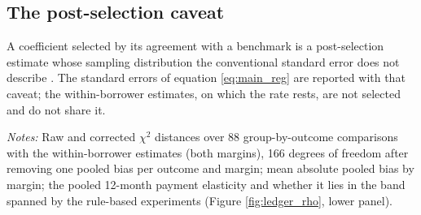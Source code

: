 \subsection{The post-selection caveat}
A coefficient selected by its agreement with a benchmark is a post-selection estimate whose sampling distribution the conventional standard error does not describe \citep{leeb_model_2005, guggenberger_impact_2010}. The standard errors of equation \eqref{eq:main_reg} are reported with that caveat; the within-borrower estimates, on which the rate rests, are not selected and do not share it.

\begin{table}[ht]
\centering
\caption{Candidate full-population specifications scored against the within-borrower estimates}
\label{tab:spec_search}
\resizebox{\textwidth}{!}{}
\vspace{0.5em}
\begin{minipage}{0.95\textwidth}
\small \textit{Notes:} Raw and corrected $\chi^2$ distances over 88 group-by-outcome comparisons with the within-borrower estimates (both margins), 166 degrees of freedom after removing one pooled bias per outcome and margin; mean absolute pooled bias by margin; the pooled 12-month payment elasticity and whether it lies in the band spanned by the rule-based experiments (Figure \ref{fig:ledger_rho}, lower panel). 
\end{minipage}
\end{table}
